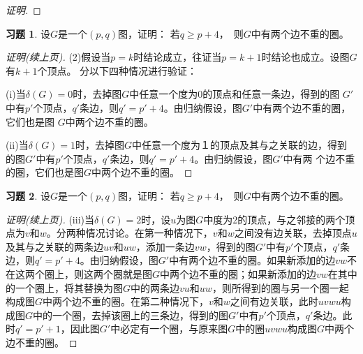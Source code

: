 \documentclass{beamer}
\theoremstyle{definition}
\theoremstyle{example}
\newtheorem*{Exercise1}{习题}
\begin{document}
\begin{CJK*}{UTF8}{gbsn}
\begin{frame}
\begin{proof}[证明]
  \end{proof}

\end{frame}

\begin{frame}
    \begin{Exercise1}
    设$G$是一个$(p,q)$图，证明：
    若$q \geq p + 4$，　则$G$中有两个边不重的圈。
  \end{Exercise1}
  \begin{proof}[证明(续上页)]

    (2)假设当$p = k$时结论成立，往证当$p = k+1$时结论也成立。设图$G$有$k+1$个顶点。
    分以下四种情况进行验证：

    
    (i)当$\delta(G)=0$时，去掉图$G$中任意一个度为0的顶点和任意一条边，得到的图
    $G'$中有$p'$个顶点，$q'$条边，则$q'=p'+4$。由归纳假设，图$G'$中有两个边不重的圈，它们也是图
    $G$中两个边不重的圈。

    (ii)当$\delta(G)=1$时，去掉图$G$中任意一个度为１的顶点及其与之关联的边，得到
    的图$G'$中有$p'$个顶点，$q'$条边，则$q' = p' + 4$。由归纳假设，图$G'$中有两
    个边不重的圈，它们也是图$G$中两个边不重的圈。

  \end{proof}

\end{frame}

\begin{frame}
    \begin{Exercise1}
    设$G$是一个$(p,q)$图，证明：
    若$q \geq p + 4$，　则$G$中有两个边不重的圈。
  \end{Exercise1}
  \begin{proof}[证明(续上页)]


    (iii)当$\delta(G)=2$时，设$u$为图$G$中度为2的顶点，与之邻接的两个顶点为$v$和$w$。分两种情况讨论。在第一种情况下，$v$和$w$之间没有边关联，去掉顶点$u$及其与之关联的两条边$uv$和$uw$，添加一条边$vw$，得到的图$G'$中有$p'$个顶点，$q'$条边，则$q'=p'+4$。由归纳假设，图$G'$中有两个边不重的圈。如果新添加的边$vw$不在这两个圈上，则这两个圈就是图$G$中两个边不重的圈；如果新添加的边$vw$在其中的一个圈上，将其替换为图$G$中的两条边$vu$和$uw$，则所得到的圈与另一个圈一起构成图$G$中两个边不重的圈。在第二种情况下，$v$和$w$之间有边关联，此时$uvwu$构成图$G$中的一个圈，去掉该圈上的三条边，得到的图$G'$中有$p'$个顶点，$q'$条边。此时$q'=p'+1$，因此图$G'$中必定有一个圈，与原来图$G$中的圈$uvwu$构成图$G$中两个边不重的圈。
  \end{proof}

\end{frame}


\end{CJK*}
\end{document}
